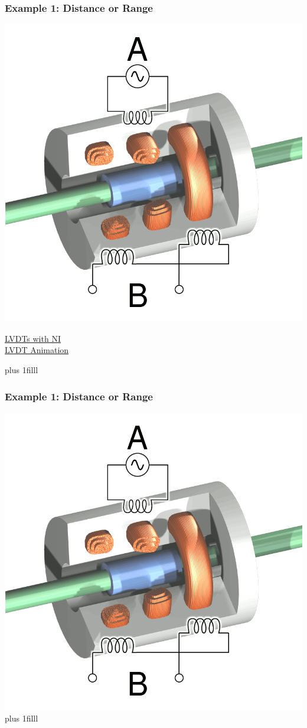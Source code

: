 \documentclass[fleqn]{beamer} %
\newcommand{\sectionIsubsectionIItitle}{Example 1: Distance or Range}
\newcommand{\btVFill}{\vskip0pt plus 1filll}
\begin{document}
		

			\begin{frame}
				\frametitle{\sectionIsubsectionIItitle}


				\includegraphics[scale=.2]{images/LVDT.png}

			 	\href{https://www.ni.com/en-us/innovations/white-papers/06/measuring-position-and-displacement-with-lvdts.html}{LVDTs with NI}\\
			 	\href{https://www.rdpe.com/us/hiw-lvdt.htm}{LVDT Animation}

			 	\btVFill
		
			\end{frame}

			\begin{frame}
				\frametitle{\sectionIsubsectionIItitle}
				\includegraphics[scale=.2]{images/LVDT.png}
				\btVFill
			\end{frame}
\end{document}

